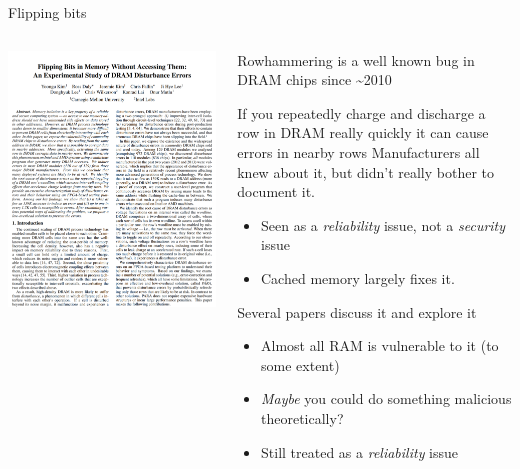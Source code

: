 \documentclass[9pt,aspectratio=169]{beamer}
\begin{document}
\begin{frame}[label={sec:org9e9abbc}]{Flipping bits}
\begin{columns}
\begin{column}[t]{0.49\columnwidth}
\begin{center}
\includegraphics[width=.9\linewidth]{./flippingbits.png}
\end{center}
\end{column}

\begin{column}[t]{0.49\columnwidth}
Rowhammering is a well known bug in DRAM chips since \textasciitilde{}2010

\begin{block}{If you repeatedly charge and discharge a row in DRAM really quickly it can cause errors in nearby rows}
Manufacturers all knew about it, but didn't really bother to document it.
\begin{itemize}
\item Seen as a \emph{reliability} issue, not a \emph{security} issue
\item Cached memory largely fixes it.
\end{itemize}

Several papers discuss it and explore it
\begin{itemize}
\item Almost all RAM is vulnerable to it (to some extent)
\item \emph{Maybe} you could do something malicious theoretically?
\item Still treated as a \emph{reliability} issue
\end{itemize}
\end{block}
\end{column}
\end{columns}
\end{frame}
\end{document}

